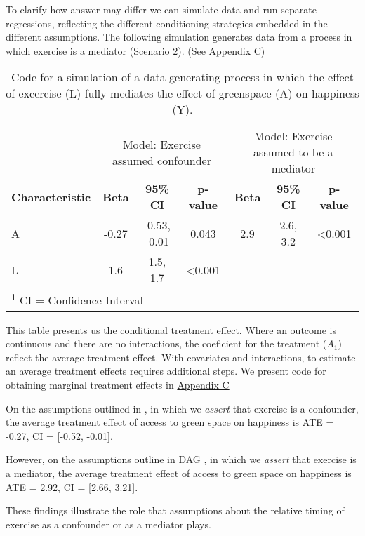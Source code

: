 \documentclass[
  singlecolumn]{article}
\begin{document}
To clarify how answer may differ we can simulate data and run separate
regressions, reflecting the different conditioning strategies embedded
in the different assumptions. The following simulation generates data
from a process in which exercise is a mediator (Scenario 2). (See
Appendix C)

\begin{table}
\caption{Code for a simulation of a data generating process in which the effect
of excercise (L) fully mediates the effect of greenspace (A) on
happiness (Y).}\tabularnewline

\centering
\begin{tabular}{lcccccc}
\toprule
\multicolumn{1}{c}{ } & \multicolumn{3}{c}{Model: Exercise assumed confounder} & \multicolumn{3}{c}{Model: Exercise assumed to be a mediator} \\
\cmidrule(l{3pt}r{3pt}){2-4} \cmidrule(l{3pt}r{3pt}){5-7}
\textbf{Characteristic} & \textbf{Beta} & \textbf{95\% CI} & \textbf{p-value} & \textbf{Beta} & \textbf{95\% CI} & \textbf{p-value}\\
\midrule
A & -0.27 & -0.53, -0.01 & 0.043 & 2.9 & 2.6, 3.2 & <0.001\\
L & 1.6 & 1.5, 1.7 & <0.001 &  &  & \\
\bottomrule
\multicolumn{7}{l}{\rule{0pt}{1em}\textsuperscript{1} CI = Confidence Interval}\\
\end{tabular}
\end{table}

This table presents us the conditional treatment effect. Where an
outcome is continuous and there are no interactions, the coeficient for
the treatment (\(A_1\)) reflect the average treatment effect. With
covariates and interactions, to estimate an average treatment effects
requires additional steps. We present code for obtaining marginal
treatment effects in \hyperref[appendix-c]{Appendix C}

On the assumptions outlined in , in which we \emph{assert} that exercise
is a confounder, the average treatment effect of access to green space
on happiness is ATE = -0.27, CI = {[}-0.52, -0.01{]}.

However, on the assumptions outline in DAG , in which we \emph{assert}
that exercise is a mediator, the average treatment effect of access to
green space on happiness is ATE = 2.92, CI = {[}2.66, 3.21{]}.

These findings illustrate the role that assumptions about the relative
timing of exercise as a confounder or as a mediator plays.
\end{document}
